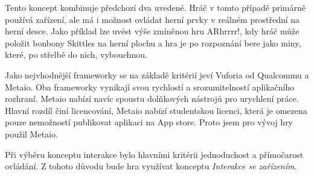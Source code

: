 \documentclass[oneside,12pt]{article}
\begin{document}
Tento koncept kombinuje předchozí dva uvedené. Hráč v tomto případě primárně používá zařízení, ale má i možnost ovládat herní prvky v reálném prostřední na herní desce. Jako příklad lze uvést výše zmíněnou hru ARhrrrr!, kdy hráč může položit bonbony Skittles na herní plochu a hra je po rozpoznání bere jako miny, které, po střelbě do nich, vybouchnou.

Jako nejvhodnější frameworky se na základě kritérií jeví Vuforia od Qualcommu a Metaio. Oba frameworky vynikají svou rychlostí a srozumitelností aplikačního rozhraní. Metaio nabízí navíc spoustu dolňkových nástrojů pro urychlení práce. Hlavní rozdíl činí licencování, Metaio nabízí studentskou licenci, která je omezena pouze nemožností publikovat aplikaci na App store. Proto jsem pro vývoj hry použil Metaio. 

Při výběru konceptu interakce bylo hlavními kritérii jednoduchost a přímočarost ovládání. Z tohoto důvodu bude hra využívat konceptu \textit{Interakce se zařízením}.
\end{document}
